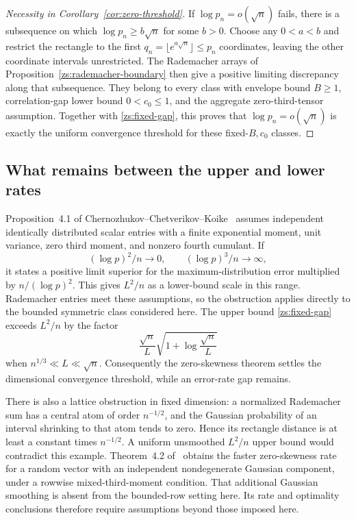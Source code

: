 \documentclass[11pt,a4paper]{article}
\theoremstyle{remark}
\begin{document}
\begin{proof}[Necessity in Corollary~\ref{cor:zero-threshold}]
If \(\log p_n=o(\sqrt n)\) fails, there is a subsequence on which
\(\log p_n\ge b\sqrt n\) for some \(b>0\). Choose any \(0<a<b\)
and restrict the rectangle to the first
\(q_n=\lfloor e^{a\sqrt n}\rfloor\le p_n\) coordinates, leaving
the other coordinate intervals unrestricted. The Rademacher arrays
of Proposition~\ref{zs:rademacher-boundary} then give a positive limiting
discrepancy along that subsequence. They belong to every class with
envelope bound \(B\ge1\), correlation-gap lower bound
\(0<c_0\le1\), and the aggregate zero-third-tensor assumption.
Together with \eqref{zs:fixed-gap}, this proves that
\(\log p_n=o(\sqrt n)\) is exactly the uniform convergence threshold
for these fixed-\(B,c_0\) classes.
\end{proof}

\subsection{What remains between the upper and lower rates}

Proposition~4.1 of Chernozhukov--Chetverikov--Koike~\cite{CCK}
assumes independent identically distributed scalar entries with a
finite exponential moment, unit variance, zero third moment, and
nonzero fourth cumulant. If
\[
 (\log p)^2/n\longrightarrow0,
 \qquad (\log p)^3/n\longrightarrow\infty,
\]
it states a positive limit superior for the maximum-distribution
error multiplied by \(n/(\log p)^2\). This gives \(L^2/n\) as a
lower-bound scale in this range. Rademacher entries meet these
assumptions, so the obstruction applies directly to the bounded
symmetric class considered here. The upper bound \eqref{zs:fixed-gap}
exceeds \(L^2/n\) by the factor
\[
 \frac{\sqrt n}{L}
 \sqrt{1+\log\frac{\sqrt n}{L}}
\]
when \(n^{1/3}\ll L\ll\sqrt n\). Consequently the zero-skewness
theorem settles the dimensional convergence threshold, while an
error-rate gap remains.

There is also a lattice obstruction in fixed dimension: a normalized
Rademacher sum has a central atom of order \(n^{-1/2}\), and the
Gaussian probability of an interval shrinking to that atom tends
to zero. Hence its rectangle distance is at least a constant times
\(n^{-1/2}\). A uniform unsmoothed \(L^2/n\) upper bound would
contradict this example. Theorem~4.2 of~\cite{CCK} obtains the faster
zero-skewness rate for a random vector with an independent
nondegenerate Gaussian component, under a rowwise mixed-third-moment
condition. That additional Gaussian smoothing is absent from the
bounded-row setting here. Its rate and optimality conclusions therefore
require assumptions beyond those imposed here.
\end{document}
